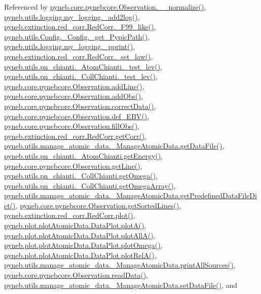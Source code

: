 Referenced by \hyperlink{pynebcore_8py_source_l04007}{pyneb.\-core.\-pynebcore.\-Observation.\-\_\-\-\_\-normalize()}, \hyperlink{logging_8py_source_l00059}{pyneb.\-utils.\-logging.\-my\-\_\-logging.\-\_\-add2log()}, \hyperlink{red__corr_8py_source_l00658}{pyneb.\-extinction.\-red\-\_\-corr.\-Red\-Corr.\-\_\-\-F99\-\_\-like()}, \hyperlink{_config_8py_source_l00115}{pyneb.\-utils.\-Config.\-\_\-\-Config.\-\_\-get\-\_\-\-Pypic\-Path()}, \hyperlink{logging_8py_source_l00051}{pyneb.\-utils.\-logging.\-my\-\_\-logging.\-\_\-pprint()}, \hyperlink{red__corr_8py_source_l00176}{pyneb.\-extinction.\-red\-\_\-corr.\-Red\-Corr.\-\_\-set\-\_\-law()}, \hyperlink{pn__chianti_8py_source_l00304}{pyneb.\-utils.\-pn\-\_\-chianti.\-\_\-\-Atom\-Chianti.\-\_\-test\-\_\-lev()}, \hyperlink{pn__chianti_8py_source_l00472}{pyneb.\-utils.\-pn\-\_\-chianti.\-\_\-\-Coll\-Chianti.\-\_\-test\-\_\-lev()}, \hyperlink{pynebcore_8py_source_l03558}{pyneb.\-core.\-pynebcore.\-Observation.\-add\-Line()}, \hyperlink{pynebcore_8py_source_l03589}{pyneb.\-core.\-pynebcore.\-Observation.\-add\-Obs()}, \hyperlink{pynebcore_8py_source_l04028}{pyneb.\-core.\-pynebcore.\-Observation.\-correct\-Data()}, \hyperlink{pynebcore_8py_source_l03983}{pyneb.\-core.\-pynebcore.\-Observation.\-def\-\_\-\-E\-B\-V()}, \hyperlink{pynebcore_8py_source_l03574}{pyneb.\-core.\-pynebcore.\-Observation.\-fill\-Obs()}, \hyperlink{red__corr_8py_source_l00211}{pyneb.\-extinction.\-red\-\_\-corr.\-Red\-Corr.\-get\-Corr()}, \hyperlink{manage__atomic__data_8py_source_l00297}{pyneb.\-utils.\-manage\-\_\-atomic\-\_\-data.\-\_\-\-Manage\-Atomic\-Data.\-get\-Data\-File()}, \hyperlink{pn__chianti_8py_source_l00366}{pyneb.\-utils.\-pn\-\_\-chianti.\-\_\-\-Atom\-Chianti.\-get\-Energy()}, \hyperlink{pynebcore_8py_source_l03665}{pyneb.\-core.\-pynebcore.\-Observation.\-get\-Line()}, \hyperlink{pn__chianti_8py_source_l00507}{pyneb.\-utils.\-pn\-\_\-chianti.\-\_\-\-Coll\-Chianti.\-get\-Omega()}, \hyperlink{pn__chianti_8py_source_l00484}{pyneb.\-utils.\-pn\-\_\-chianti.\-\_\-\-Coll\-Chianti.\-get\-Omega\-Array()}, \hyperlink{manage__atomic__data_8py_source_l00034}{pyneb.\-utils.\-manage\-\_\-atomic\-\_\-data.\-\_\-\-Manage\-Atomic\-Data.\-get\-Predefined\-Data\-File\-Dict()}, \hyperlink{pynebcore_8py_source_l03684}{pyneb.\-core.\-pynebcore.\-Observation.\-get\-Sorted\-Lines()}, \hyperlink{red__corr_8py_source_l00303}{pyneb.\-extinction.\-red\-\_\-corr.\-Red\-Corr.\-plot()}, \hyperlink{plot_atomic_data_8py_source_l00117}{pyneb.\-plot.\-plot\-Atomic\-Data.\-Data\-Plot.\-plot\-A()}, \hyperlink{plot_atomic_data_8py_source_l00189}{pyneb.\-plot.\-plot\-Atomic\-Data.\-Data\-Plot.\-plot\-All\-A()}, \hyperlink{plot_atomic_data_8py_source_l00373}{pyneb.\-plot.\-plot\-Atomic\-Data.\-Data\-Plot.\-plot\-Omega()}, \hyperlink{plot_atomic_data_8py_source_l00262}{pyneb.\-plot.\-plot\-Atomic\-Data.\-Data\-Plot.\-plot\-Rel\-A()}, \hyperlink{manage__atomic__data_8py_source_l00431}{pyneb.\-utils.\-manage\-\_\-atomic\-\_\-data.\-\_\-\-Manage\-Atomic\-Data.\-print\-All\-Sources()}, \hyperlink{pynebcore_8py_source_l03711}{pyneb.\-core.\-pynebcore.\-Observation.\-read\-Data()}, \hyperlink{manage__atomic__data_8py_source_l00380}{pyneb.\-utils.\-manage\-\_\-atomic\-\_\-data.\-\_\-\-Manage\-Atomic\-Data.\-set\-Data\-File()}, and 